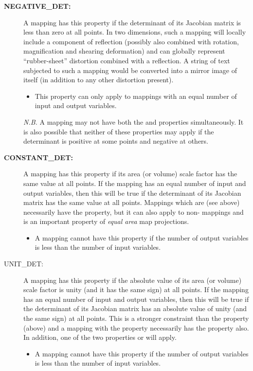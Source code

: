 \begin{description}
\item[{\bf NEGATIVE\_DET:}] A mapping has this property if the determinant
of its Jacobian matrix is less than zero at all points. 
In two dimensions, such a mapping will locally include a component of
reflection (possibly also combined with rotation, magnification and shearing
deformation) and can globally represent ``rubber-sheet'' distortion
combined with a reflection.
A string of text subjected to such a mapping would be converted into a
mirror image of itself (in addition to any other distortion present). 

\begin{itemize}
\item This property can only apply to mappings with an equal number of input
and output variables. 
\end{itemize}

{\em N.B.} A mapping may not have both the  and
 properties simultaneously. 
It is also possible that neither of these properties may apply if the
determinant is positive at some points and negative at others. 

\item[{\bf CONSTANT\_DET:}] A mapping has this property if its area (or 
volume) scale factor has the same value at all points. 
If the mapping has an equal number of input and output variables, then this
will be true if the determinant of its Jacobian matrix has the same value at
all points. 
Mappings which are  (see above) necessarily have the
 property, but it can also apply to non-
mappings and is an important property of {\em equal area} map projections.

\begin{itemize}
\item A mapping cannot have this property if the number of output variables
is less than the number of input variables. 
\end{itemize}

\item[{UNIT\_DET:}]  A mapping has this property if the absolute value of
its area (or volume) scale factor is unity (and it has the same sign) at all
points. 
If the mapping has an equal number of input and output variables, then this
will be true if the determinant of its Jacobian matrix has an absolute value
of unity (and the same sign) at all points. 
This is a stronger constraint than the  property (above)
and a mapping with the  property necessarily has the
 property also. 
In addition, one of the two properties  or
 will apply. 

\begin{itemize}
\item A mapping cannot have this property if the number of output variables
is less than the number of input variables. 
\end{itemize}

\end{description}


